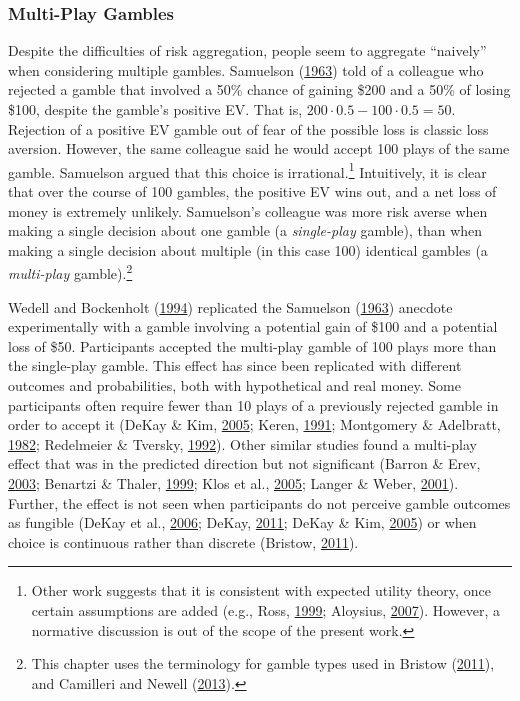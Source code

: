 \documentclass[
  english,
  man, donotrepeattitle,floatsintext]{apa7}
\theoremstyle{definition}
\theoremstyle{definition}
\theoremstyle{definition}
\theoremstyle{definition}
\theoremstyle{remark}
\begin{document}
\hypertarget{multi-play-gambles}{%
\subsubsection{Multi-Play Gambles}\label{multi-play-gambles}}

Despite the difficulties of risk aggregation, people seem to aggregate ``naively''
when considering multiple gambles. Samuelson (\protect\hyperlink{ref-samuelson1963}{1963}) told of a colleague who
rejected a gamble that involved a 50\% chance of gaining \$200 and a 50\% of losing
\$100, despite the gamble's positive EV. That is, \(200 \cdot 0.5 - 100 \cdot 0.5 = 50\). Rejection of a positive EV gamble out of fear of the possible loss is
classic loss aversion. However, the same colleague said he would accept 100
plays of the same gamble. Samuelson argued that this choice is
irrational.\footnote{Other work suggests that it is consistent with expected utility
  theory, once certain assumptions are added (e.g., Ross, \protect\hyperlink{ref-ross1999}{1999}; Aloysius, \protect\hyperlink{ref-aloysius2007}{2007}).
  However, a normative discussion is out of the scope of the present work.} Intuitively, it is clear that over the course of 100
gambles, the positive EV wins out, and a net loss of money is extremely
unlikely. Samuelson's colleague was more risk averse when making a single
decision about one gamble (a \emph{single-play} gamble), than when making a single
decision about multiple (in this case 100) identical gambles (a \emph{multi-play}
gamble).\footnote{This chapter uses the terminology for gamble types used in
  Bristow (\protect\hyperlink{ref-bristow2011}{2011}), and Camilleri and Newell (\protect\hyperlink{ref-camilleri2013}{2013}).}

Wedell and Bockenholt (\protect\hyperlink{ref-wedell1994}{1994}) replicated the Samuelson (\protect\hyperlink{ref-samuelson1963}{1963}) anecdote experimentally with a gamble
involving a potential gain of \$100 and a potential loss of \$50. Participants
accepted the multi-play gamble of 100 plays more than the single-play gamble.
This effect has since been replicated with different outcomes and probabilities,
both with hypothetical and real money. Some participants often require fewer
than 10 plays of a previously rejected gamble in order to accept it (DeKay \& Kim, \protect\hyperlink{ref-dekay2005}{2005}; Keren, \protect\hyperlink{ref-keren1991}{1991}; Montgomery \& Adelbratt, \protect\hyperlink{ref-montgomery1982}{1982}; Redelmeier \& Tversky, \protect\hyperlink{ref-redelmeier1992}{1992}). Other similar studies found a
multi-play effect that was in the predicted direction but not significant
(Barron \& Erev, \protect\hyperlink{ref-barron2003}{2003}; Benartzi \& Thaler, \protect\hyperlink{ref-benartzi1999}{1999}; Klos et al., \protect\hyperlink{ref-klos2005}{2005}; Langer \& Weber, \protect\hyperlink{ref-langer2001}{2001}). Further, the effect is not
seen when participants do not perceive gamble outcomes as fungible (DeKay et al., \protect\hyperlink{ref-dekay2006}{2006}; DeKay, \protect\hyperlink{ref-dekay2011}{2011}; DeKay \& Kim, \protect\hyperlink{ref-dekay2005}{2005}) or when choice is continuous rather than discrete
(Bristow, \protect\hyperlink{ref-bristow2011}{2011}).
\end{document}
